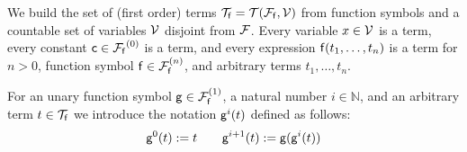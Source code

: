 
\begin{definition}\label{def:terms}
	We build the set of (first order) {\myem terms }$\mcTf = \mcTFfV$ 
	from function symbols and a
	countable set of {\myem variables }$\mcV$ disjoint from $\mcF$\!.
	Every variable $x\in\mcV$ is a term,
	every {\myem constant} $\mc\in\mcFf^{(0)}$ is a term, 
	and every expression $\mf(t_1,\ldots,t_n)$ is a term
	for $n>0$, function symbol $\mf\in\mcFfn$,  
	and arbitrary terms $t_1,\ldots,t_n$.
\end{definition}

\begin{definition}
	For an unary function symbol $\mg\in\mcFfn[1]$, a natural number
	$i\in\mathbb{N}$, and an arbitrary term $t\in\mcTf$ we introduce the notation $\mg^i(t)$ defined as follows:
	\[
	\mg^0(t) := t \qquad
	\mg^{i+1}(t) := \mg(\mg^i(t))
	\]
\end{definition}

